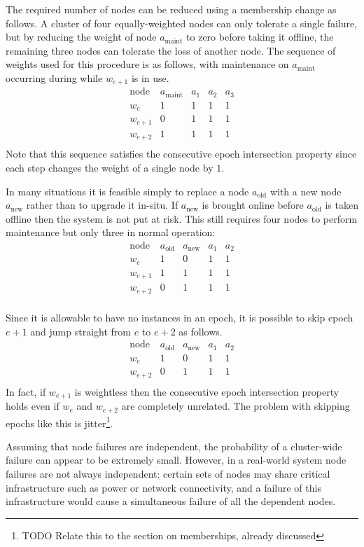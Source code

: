 \documentclass[journal]{IEEEtran}
\begin{document}
The required number of nodes can be reduced using a membership change as
follows. A cluster of four equally-weighted nodes can only tolerate a single
failure, but by reducing the weight of node $a_{\textrm{maint}}$ to zero before
taking it offline, the remaining three nodes can tolerate the loss of another
node. The sequence of weights used for this procedure is as follows, with
maintenance on $a_{\textrm{maint}}$ occurring during while $w_{e+1}$ is in use.
\[\begin{array}{rcccc}
\textrm{node}&a_{\textrm{maint}}&a_1&a_2&a_3 \\
w_e&1&1&1&1\\
w_{e+1}&0&1&1&1\\
w_{e+2}&1&1&1&1\\
\end{array}\]
Note that this sequence satisfies the consecutive epoch intersection property
since each step changes the weight of a single node by $1$.

In many situations it is feasible simply to replace a node $a_{\textrm{old}}$
with a new node $a_{\textrm{new}}$ rather than to upgrade it in-situ. If
$a_{\textrm{new}}$ is brought online before $a_{\textrm{old}}$ is taken offline
then the system is not put at risk.  This still requires four nodes to perform
maintenance but only three in normal operation:
\[\begin{array}{rcccc}
\textrm{node}&a_{\textrm{old}}&a_{\textrm{new}}&a_1&a_2 \\
w_e&1&0&1&1\\
w_{e+1}&1&1&1&1\\
w_{e+2}&0&1&1&1\\
\end{array}\]

Since it is allowable to have no instances in an epoch, it is possible to skip
epoch $e+1$ and jump straight from $e$ to $e+2$ as follows.
\[\begin{array}{rcccc}
\textrm{node}&a_{\textrm{old}}&a_{\textrm{new}}&a_1&a_2 \\
w_e&1&0&1&1\\
w_{e+2}&0&1&1&1\\
\end{array}\]
In fact, if $w_{e+1}$ is weightless then the consecutive epoch intersection
property holds even if $w_e$ and $w_{e+2}$ are completely unrelated. The
problem with skipping epochs like this is jitter\footnote{TODO Relate this to
the section on memberships, already discussed}.

Assuming that node failures are independent, the probability of a cluster-wide
failure can appear to be extremely small. However, in a real-world system node
failures are not always independent: certain sets of nodes may share critical
infrastructure such as power or network connectivity, and a failure of this
infrastructure would cause a simultaneous failure of all the dependent nodes.
\end{document}
